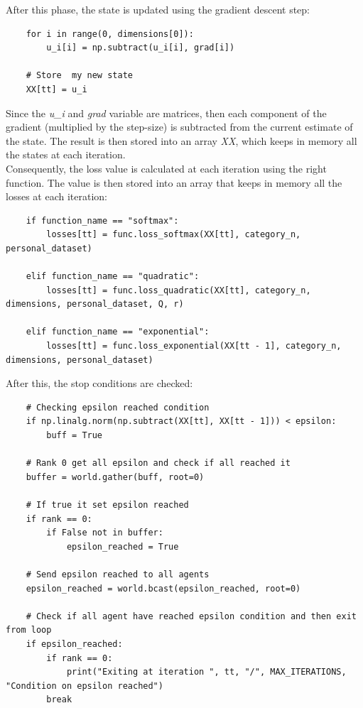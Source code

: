\documentclass[a4paper,11pt,oneside]{book}
\begin{document}
After this phase, the state is updated using the gradient descent step:
\begin{lstlisting}
    for i in range(0, dimensions[0]):
        u_i[i] = np.subtract(u_i[i], grad[i])

    # Store  my new state
    XX[tt] = u_i
\end{lstlisting}
Since the \textit{u\_i} and \textit{grad} variable are matrices, then each component of the gradient (multiplied by the step-size) is subtracted from the current estimate of the state. The result is then stored into an array \textit{XX}, which keeps in memory all the states at each iteration. \\

Consequently, the loss value is calculated at each iteration using the right function. The value is then stored into an array that keeps in memory all the losses at each iteration:
\begin{lstlisting}
    if function_name == "softmax":
        losses[tt] = func.loss_softmax(XX[tt], category_n, personal_dataset)

    elif function_name == "quadratic":
        losses[tt] = func.loss_quadratic(XX[tt], category_n, dimensions, personal_dataset, Q, r)

    elif function_name == "exponential":
        losses[tt] = func.loss_exponential(XX[tt - 1], category_n, dimensions, personal_dataset)
\end{lstlisting}

After this, the stop conditions are checked:
\begin{lstlisting}
    # Checking epsilon reached condition
    if np.linalg.norm(np.subtract(XX[tt], XX[tt - 1])) < epsilon:
        buff = True

    # Rank 0 get all epsilon and check if all reached it
    buffer = world.gather(buff, root=0)

    # If true it set epsilon reached
    if rank == 0:
        if False not in buffer:
            epsilon_reached = True

    # Send epsilon reached to all agents
    epsilon_reached = world.bcast(epsilon_reached, root=0)

    # Check if all agent have reached epsilon condition and then exit from loop
    if epsilon_reached:
        if rank == 0:
            print("Exiting at iteration ", tt, "/", MAX_ITERATIONS, "Condition on epsilon reached")
        break
\end{lstlisting}
\end{document}
